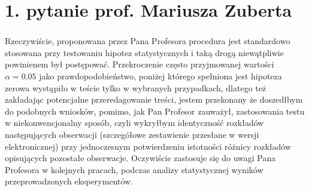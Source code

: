 \section*{1. pytanie prof. Mariusza Zuberta}
\begin{frame}
\frametitle{\secname}
\framesubtitle{\fontsize{5}{0}\selectfont{Moje drobne zastrzeżenie budzi analiza poziomu ufności testów Dunna na podstawie uzyskanych wyników. Byłoby lepiej założyć poziom ufności i dla niego potwierdzić lub odrzucić hipotezę o statystycznej identyczności uzyskanych rozwiązań dla różnych algorytmów koordynujących ruch jednostek mobilnych.}}

\small
Rzeczywiście, proponowana przez Pana Profesora procedura jest standardowo stosowana przy testowaniu hipotez statystycznych i taką drogą niewątpliwie powinienem był postępować. Przekroczenie często przyjmowanej  wartości $\alpha=0.05$ jako prawdopodobieństwo, poniżej którego spełniona jest hipoteza zerowa wystąpiło w teście tylko w wybranych przypadkach, dlatego też zakładając potencjalne przeredagowanie treści, jestem przekonany że doszedłbym do podobnych wniosków, pomimo, jak Pan Profesor zauważył, zastosowania testu w niekonwencjonalny sposób, czyli wykryłbym identyczność rozkładów  następujących obserwacji (szczegółowe zestawienie przesłane w wersji elektronicznej) przy jednoczesnym potwierdzeniu istotności różnicy rozkładów opisujących pozostałe obserwacje. Oczywiście zastosuje się do uwagi Pana Profesora w kolejnych pracach, podczas analizy statystycznej wyników przeprowadzonych eksperymentów.

\end{frame}
